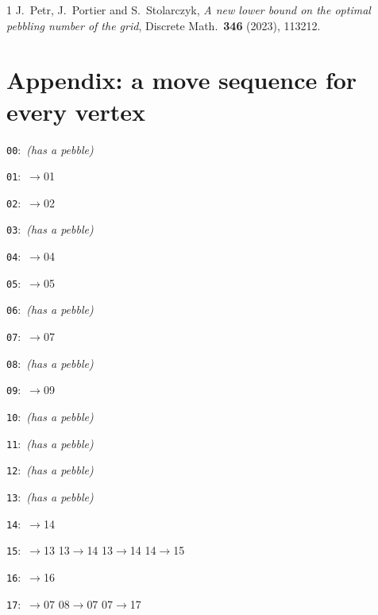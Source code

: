 \documentclass[11pt]{amsart}
\begin{document}
\begin{thebibliography}{1}
J.~Petr, J.~Portier and S.~Stolarczyk,
\emph{A new lower bound on the optimal pebbling number of the grid},
Discrete Math.\ \textbf{346} (2023), 113212.
\end{thebibliography}

\newpage
\appendix
\section*{Appendix: a move sequence for every vertex}
\begin{flushleft}
\noindent\texttt{00}:\ {\footnotesize\ttfamily \textrm{\itshape (has a pebble)}}\par
\noindent\texttt{01}:\ {\footnotesize{}$\to$01}\par
\noindent\texttt{02}:\ {\footnotesize{}$\to$02}\par
\noindent\texttt{03}:\ {\footnotesize\ttfamily \textrm{\itshape (has a pebble)}}\par
\noindent\texttt{04}:\ {\footnotesize{}$\to$04}\par
\noindent\texttt{05}:\ {\footnotesize{}$\to$05}\par
\noindent\texttt{06}:\ {\footnotesize\ttfamily \textrm{\itshape (has a pebble)}}\par
\noindent\texttt{07}:\ {\footnotesize{}$\to$07}\par
\noindent\texttt{08}:\ {\footnotesize\ttfamily \textrm{\itshape (has a pebble)}}\par
\noindent\texttt{09}:\ {\footnotesize{}$\to$09}\par
\noindent\texttt{10}:\ {\footnotesize\ttfamily \textrm{\itshape (has a pebble)}}\par
\noindent\texttt{11}:\ {\footnotesize\ttfamily \textrm{\itshape (has a pebble)}}\par
\noindent\texttt{12}:\ {\footnotesize\ttfamily \textrm{\itshape (has a pebble)}}\par
\noindent\texttt{13}:\ {\footnotesize\ttfamily \textrm{\itshape (has a pebble)}}\par
\noindent\texttt{14}:\ {\footnotesize{}$\to$14}\par
\noindent\texttt{15}:\ {\footnotesize{}$\to$13 13$\to$14 13$\to$14 14$\to$15}\par
\noindent\texttt{16}:\ {\footnotesize{}$\to$16}\par
\noindent\texttt{17}:\ {\footnotesize{}$\to$07 08$\to$07 07$\to$17}\par

\end{flushleft}
\end{document}
